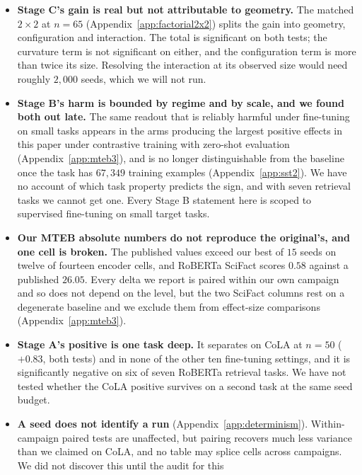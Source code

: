 \documentclass{article}
\begin{document}
\begin{itemize}
\itemsep1pt
\item \textbf{Stage C's gain is real but not attributable to geometry.} The
      matched $2\times2$ at $n=65$ (Appendix~\ref{app:factorial2x2}) splits the
      gain into geometry, configuration and interaction. The total is
      significant on both tests; the curvature term is not significant on
      either, and the configuration term is more than twice its size.
      Resolving the interaction at its observed size would need roughly
      $2{,}000$ seeds, which we will not run.
\item \textbf{Stage B's harm is bounded by regime and by scale, and we found
      both out late.} The same readout that is reliably harmful under
      fine-tuning on small tasks appears in the arms producing the largest
      positive effects in this paper under contrastive training with zero-shot
      evaluation
      (Appendix~\ref{app:mteb3}), and is no longer distinguishable from the
      baseline once the task has $67{,}349$ training examples
      (Appendix~\ref{app:sst2}). We have no account of which task property
      predicts the sign, and with seven retrieval tasks we cannot get one. Every
      Stage B statement here is scoped to supervised fine-tuning on small
      target tasks.
\item \textbf{Our MTEB absolute numbers do not reproduce the original's, and
      one cell is broken.} The published values exceed our best of $15$ seeds on
      twelve of fourteen encoder cells, and RoBERTa SciFact scores $0.58$
      against a published $26.05$. Every delta we report is paired within our
      own campaign and so does not depend on the level, but the two SciFact
      columns rest on a degenerate baseline and we exclude them from effect-size
      comparisons (Appendix~\ref{app:mteb3}).
\item \textbf{Stage A's positive is one task deep.} It separates on CoLA at
      $n=50$ ($+0.83$, both tests) and in none of the other ten fine-tuning
      settings, and it is significantly negative on six of seven RoBERTa
      retrieval tasks. We have not tested whether the CoLA positive survives on
      a second task at the same seed budget.
\item \textbf{A seed does not identify a run} (Appendix~\ref{app:determinism}).
      Within-campaign paired tests are unaffected, but pairing recovers much
      less variance than we claimed on CoLA, and no table may splice cells
      across campaigns. We did not discover this until the audit for this

\end{itemize}
\end{document}
